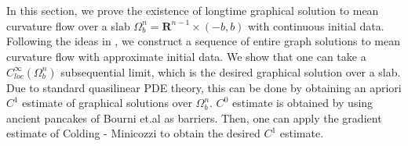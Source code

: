 \documentclass[pdflatex,sn-mathphys-num]{sn-jnl}%
\begin{document}
\section{}\label{existence of graphical solution section}
In this section, we prove the existence of longtime graphical solution to mean curvature flow over a slab $\Omega^n_b = \mathbf{R}^{n-1} \times (-b, b)$ with continuous initial data. Following the ideas in \cite{bowlstability}, we construct a sequence of entire graph solutions to mean curvature flow with approximate initial data. We show that one can take a $C^{\infty}_{loc}(\Omega^n_b)$ subsequential limit, which is the desired graphical solution over a slab. Due to standard quasilinear PDE theory, this can be done by obtaining an apriori $C^1$ estimate of graphical solutions over $\Omega^n_b$. $C^0$ estimate is obtained by using ancient pancakes of Bourni et.al \cite{ancientpancake} as barriers. Then, one can apply the gradient estimate of Colding - Minicozzi \cite{gradientestimate} to obtain the desired $C^1$ estimate. \\
\end{document}
